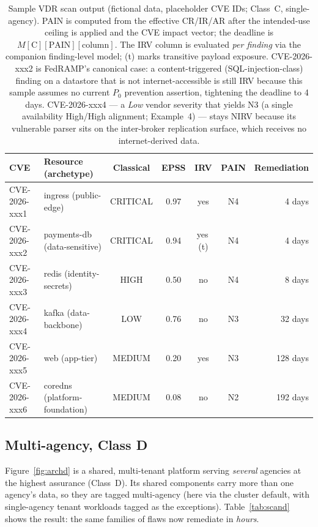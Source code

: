\documentclass[11pt]{article}
\newcommand{\tagn}[1]{{\footnotesize\ttfamily #1}}
\begin{document}
\begin{table}[H]
\centering
\renewcommand{\arraystretch}{1.3}
\setlength{\tabcolsep}{4pt}
\footnotesize
\begin{tabular}{l l c c c c r}
\toprule
\textbf{CVE} & \textbf{Resource (archetype)} & \textbf{Classical} & \textbf{EPSS} & \textbf{IRV} & \textbf{PAIN} & \textbf{Remediation} \\
\midrule
CVE-2026-xxx1 & ingress \tagn{(public-edge)}        & \cellcolor{crit!25}CRITICAL & 0.97 & yes & \cellcolor{high!35}N4 & 4 days \\
CVE-2026-xxx2 & payments-db \tagn{(data-sensitive)} & \cellcolor{crit!25}CRITICAL & 0.94 & yes\,(t) & \cellcolor{high!35}N4 & 4 days \\
CVE-2026-xxx3 & redis \tagn{(identity-secrets)}     & \cellcolor{high!25}HIGH     & 0.50 & no  & \cellcolor{high!35}N4 & 8 days \\
CVE-2026-xxx4 & kafka \tagn{(data-backbone)}        & \cellcolor{low!30}LOW       & 0.76 & no  & \cellcolor{med!35}N3 & 32 days \\
CVE-2026-xxx5 & web \tagn{(app-tier)}               & \cellcolor{med!35}MEDIUM    & 0.20 & yes & \cellcolor{med!35}N3 & 128 days \\
CVE-2026-xxx6 & coredns \tagn{(platform-foundation)}& \cellcolor{med!35}MEDIUM    & 0.08 & no  & \cellcolor{low!30}N2 & 192 days \\
\bottomrule
\end{tabular}
\caption{Sample VDR scan output (fictional data, placeholder CVE IDs; Class~C, single-agency). PAIN is
computed from the effective CR/IR/AR after the intended-use ceiling is applied
and the CVE impact vector; the deadline is
$M[\text{C}][\text{PAIN}][\text{column}]$. The IRV column is evaluated \emph{per
finding} via the companion finding-level model; (t) marks transitive payload
exposure. CVE-2026-xxx2 is FedRAMP's canonical case: a content-triggered
(SQL-injection-class) finding on a datastore that is not internet-accessible is
still IRV because this sample assumes no current $P_0$ prevention assertion,
tightening the deadline to 4 days. CVE-2026-xxx4 --- a \emph{Low}
vendor severity that yields N3 (a single availability High/High alignment;
Example~4) --- stays NIRV because its
vulnerable parser sits on the inter-broker replication surface, which receives no
internet-derived data.}
\label{tab:scan}
\end{table}

\subsection{Multi-agency, Class D}
Figure~\ref{fig:archd} is a shared, multi-tenant platform serving \emph{several}
agencies at the highest assurance (Class~D). Its shared components carry more than
one agency's data, so they are tagged multi-agency (here via the cluster default,
with single-agency tenant workloads tagged as the exceptions). Table~\ref{tab:scand}
shows the result: the same families of flaws now remediate in \emph{hours}.
\end{document}
